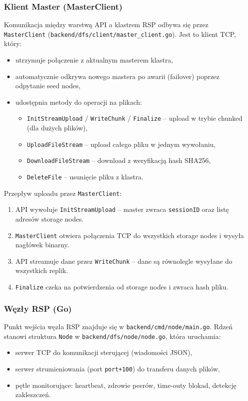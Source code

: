 \documentclass[12pt,a4paper]{article}
\begin{document}
	\subsubsection{Klient Master (MasterClient)}
	Komunikacja między warstwą API a klastrem RSP odbywa się przez \texttt{MasterClient} (\texttt{backend/dfs/client/master\_client.go}). Jest to klient TCP, który:
	\begin{itemize}
		\item utrzymuje połączenie z aktualnym masterem klastra,
		\item automatycznie odkrywa nowego mastera po awarii (failover) poprzez odpytanie seed nodes,
		\item udostępnia metody do operacji na plikach:
		\begin{itemize}
			\item \texttt{InitStreamUpload} / \texttt{WriteChunk} / \texttt{Finalize} -- upload w trybie chunked (dla dużych plików),
			\item \texttt{UploadFileStream} -- upload całego pliku w jednym wywołaniu,
			\item \texttt{DownloadFileStream} -- download z weryfikacją hash SHA256,
			\item \texttt{DeleteFile} -- usunięcie pliku z klastra.
		\end{itemize}
	\end{itemize}
	
	Przepływ uploadu przez \texttt{MasterClient}:
	\begin{enumerate}
		\item API wywołuje \texttt{InitStreamUpload} -- master zwraca \texttt{sessionID} oraz listę adresów storage nodes.
		\item \texttt{MasterClient} otwiera połączenia TCP do wszystkich storage nodes i wysyła nagłówek binarny.
		\item API streamuje dane przez \texttt{WriteChunk} -- dane są równolegle wysyłane do wszystkich replik.
		\item \texttt{Finalize} czeka na potwierdzenia od storage nodes i zwraca hash pliku.
	\end{enumerate}

	\subsubsection{Węzły RSP (Go)}
	Punkt wejścia węzła RSP znajduje się w \texttt{backend/cmd/node/main.go}. Rdzeń stanowi struktura \texttt{Node} w \texttt{backend/dfs/node/node.go}, która uruchamia:
	\begin{itemize}
		\item serwer TCP do komunikacji sterującej (wiadomości JSON),
		\item serwer strumieniowania (port \texttt{port+100}) do transferu danych plików,
		\item pętle monitorujące: heartbeat, zdrowie peerów, time-outy blokad, detekcję zakleszczeń.
	\end{itemize}
	
\end{document}
